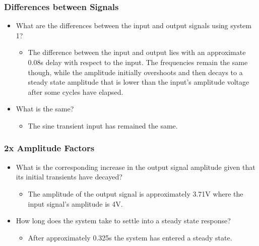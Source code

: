\documentclass[12pt]{article}
\begin{document}
\subsubsection{Differences between Signals}
\begin{itemize}
\item What are the differences between the input and output signals using system 1?
\begin{itemize}
\item The difference between the input and output lies with an approximate 0.08s delay with respect to the input. The frequencies remain the same though, while the amplitude initially overshoots and then decays to a steady state amplitude that is lower than the input's amplitude voltage after some cycles have elapsed.
\end{itemize}
\item What is the same?
\begin{itemize}
\item The sine transient input has remained the same.
\end{itemize}
\end{itemize}
\subsubsection{2x Amplitude Factors}
\begin{itemize}
\item What is the corresponding increase in the output signal amplitude given that its initial transients have decayed?
\begin{itemize}
\item The amplitude of the output signal is approximately 3.71V where the input signal's amplitude is 4V.
\end{itemize}
\item How long does the system take to settle into a steady state response?
\begin{itemize}
\item After approximately 0.325s the system has entered a steady state.
\end{itemize}
\end{itemize}
\end{document}
